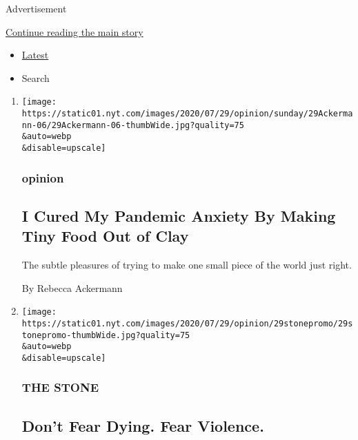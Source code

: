 Advertisement

\protect\hyperlink{after-mid1}{Continue reading the main story}

\begin{itemize}
\tightlist
\item
  \protect\hyperlink{stream-panel}{Latest}
\item
  Search
\end{itemize}

\begin{enumerate}
\def\labelenumi{\arabic{enumi}.}
\item
  \href{/2020/07/29/opinion/food-covid-quarantine-clay.html}{}

  \texttt{[image: https://static01.nyt.com/images/2020/07/29/opinion/sunday/29Ackermann-06/29Ackermann-06-thumbWide.jpg?quality=75\\\&auto=webp\\\&disable=upscale]}

  \hypertarget{opinion-2}{%
  \subsubsection{opinion}\label{opinion-2}}

  \hypertarget{i-cured-my-pandemic-anxiety-by-making-tiny-food-out-of-clay-1}{%
  \subsection{I Cured My Pandemic Anxiety By Making Tiny Food Out of
  Clay}\label{i-cured-my-pandemic-anxiety-by-making-tiny-food-out-of-clay-1}}

  The subtle pleasures of trying to make one small piece of the world
  just right.

  By Rebecca Ackermann
\item
  \href{/2020/07/29/opinion/jainism-nonviolence-death.html}{}

  \texttt{[image: https://static01.nyt.com/images/2020/07/29/opinion/29stonepromo/29stonepromo-thumbWide.jpg?quality=75\\\&auto=webp\\\&disable=upscale]}

  \hypertarget{the-stone}{%
  \subsubsection{THE STONE}\label{the-stone}}

  \hypertarget{dont-fear-dying-fear-violence}{%
  \subsection{Don't Fear Dying. Fear
  Violence.}\label{dont-fear-dying-fear-violence}}


\end{enumerate}
